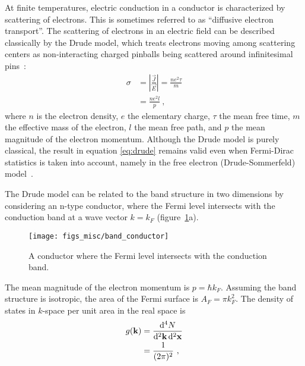 At finite temperatures, electric conduction in a conductor is characterized by scattering of electrons. This is sometimes referred to as ``diffusive electron transport''. The scattering of electrons in an electric field can be described classically by the Drude model, which treats electrons moving among scattering centers as non-interacting charged pinballs being scattered around infinitesimal pins~\cite{drude1900a}:%
\begin{align}%
    \sigma &= \left|\frac{\vec{J}}{\vec{E}}\right| = \frac{ne^2\tau}{m}\\
        &= \frac{ne^2l}{p}~,\label{eq:drude}
\end{align}%
where $n$ is the electron density, $e$ the elementary charge, $\tau$ the mean free time, $m$ the effective mass of the electron, $l$ the mean free path, and $p$ the mean magnitude of the electron momentum. Although the Drude model is purely classical, the result in equation \ref{eq:drude} remains valid even when Fermi-Dirac statistics is taken into account, namely in the free electron (Drude-Sommerfeld) model~\cite{sommerfeld1928}.

The Drude model can be related to the band structure in two dimensions by considering an n-type conductor, where the Fermi level intersects with the conduction band at a wave vector $k = k_F$ (figure~\ref{fig:band_conductor}a). %
\begin{figure}[ht]%
    \centering%
    \texttt{[image: figs\_misc/band\_conductor]}%
    \caption[Band structure of an n-type conductor]{\label{fig:band_conductor}A conductor where the Fermi level intersects with the conduction band.}%
\end{figure}%
%
The mean magnitude of the electron momentum is $p = \hbar k_F$. Assuming the band structure is isotropic, the area of the Fermi surface is $A_F = \pi k_F^2$. The density of states in $k$-space per unit area in the real space is%
\begin{align}
    g(\mathbf{k}) &= \frac{\mathop{}\!\mathrm{d}^4N}{\mathop{}\!\mathrm{d}^2 \mathbf{k} \mathop{}\!\mathrm{d}^2 \mathbf{x}}\nonumber\\
        & = \frac{1}{(2\pi)^2}~,
\end{align}%
